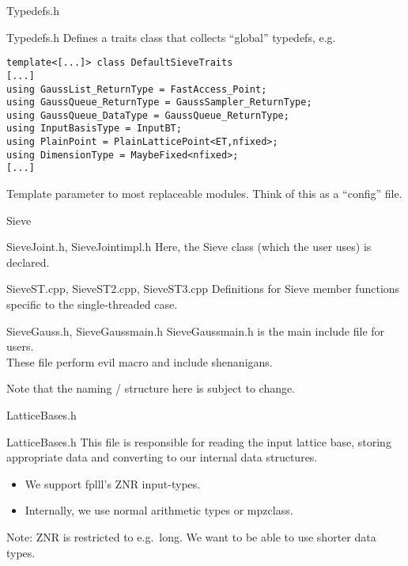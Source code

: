 \documentclass{beamer}
\begin{document}
\begin{frame}[fragile]{Typedefs.h}
\begin{block}{Typedefs.h}
Defines a traits class that collects ``global'' typedefs, e.g.\\
\begin{verbatim}
template<[...]> class DefaultSieveTraits 
[...]
using GaussList_ReturnType = FastAccess_Point;
using GaussQueue_ReturnType = GaussSampler_ReturnType;
using GaussQueue_DataType = GaussQueue_ReturnType;
using InputBasisType = InputBT;
using PlainPoint = PlainLatticePoint<ET,nfixed>;
using DimensionType = MaybeFixed<nfixed>;
[...]
\end{verbatim}
Template parameter to most replaceable modules. Think of this as a ``config'' file. 
\end{block}
\end{frame}

\begin{frame}{Sieve}
\begin{block}{SieveJoint.h, SieveJoint\textunderscore impl.h}
Here, the Sieve class (which the user uses) is declared.
\end{block}
\begin{block}{SieveST.cpp, SieveST2.cpp, SieveST3.cpp}
Definitions for Sieve member functions specific to the single-threaded case.
\end{block}
\begin{block}{SieveGauss.h, SieveGauss\textunderscore main.h}
SieveGauss\textunderscore main.h is the main include file for users.\\
These file perform evil macro and include shenanigans.
\end{block}
Note that the naming / structure here is subject to change.
\end{frame}

\begin{frame}{LatticeBases.h}
\begin{block}{LatticeBases.h}
This file is responsible for reading the input lattice base, storing appropriate data and converting to our internal data structures.
\begin{itemize}
\item We support fplll's Z\textunderscore NR input-types.
\item Internally, we use normal arithmetic types or mpz\textunderscore class.
\end{itemize}
Note: Z\textunderscore NR is restricted to e.g.\ long. We want to be able to use shorter data types.
\end{block}
\end{frame}
\end{document}
